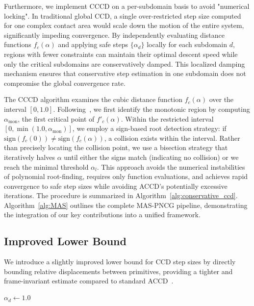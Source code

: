 \documentclass[acmtog,anonymous,review,screen,nonacm]{acmart}
\begin{document}
Furthermore, we implement CCCD on a per-subdomain basis to avoid "numerical locking". In traditional global CCD, a single over-restricted step size computed for one complex contact area would scale down the motion of the entire system, significantly impeding convergence. By independently evaluating distance functions $f_{c}(\alpha)$ and applying safe steps $\{\alpha_d\}$ locally for each subdomain $d$, regions with fewer constraints can maintain their optimal descent speed while only the critical subdomains are conservatively damped. This localized damping mechanism ensures that conservative step estimation in one subdomain does not compromise the global convergence rate.

The CCCD algorithm examines the cubic distance function $f_{c}(\alpha)$ over the interval $[0, 1.0]$. Following~\cite{cypo}, we first identify the monotonic region by computing $\alpha_{\text{mon}}$, the first critical point of $f'_{c}(\alpha)$. Within the restricted interval $[0, \min(1.0, \alpha_{\text{mon}})]$, we employ a sign-based root detection strategy: if $\text{sign}(f_{c}(0)) \neq \text{sign}(f_{c}(\alpha))$, a collision exists within the interval. Rather than precisely locating the collision point, we use a bisection strategy that iteratively halves $\alpha$ until either the signs match (indicating no collision) or we reach the minimal threshold $\alpha_l$. This approach avoids the numerical instabilities of polynomial root-finding, requires only function evaluations, and achieves rapid convergence to safe step sizes while avoiding ACCD’s potentially excessive iterations. The procedure is summarized in Algorithm~\ref{alg:conservative_ccd}.
Algorithm~\ref{alg:MAS} outlines the complete MAS-PNCG pipeline, demonstrating the integration of our key contributions into a unified framework.

\subsection{Improved Lower Bound}
\label{sec:tighter_lower_bound}
We introduce a slightly improved lower bound for CCD step sizes by directly bounding relative displacements between primitives, providing a tighter and frame-invariant estimate compared to standard ACCD~\cite{li2021codimensional}. 


\begin{algorithm}[htbp!]
\caption{Subdomain Conservative CCD}
\label{alg:conservative_ccd}
$\alpha_d \gets 1.0$\;
\end{algorithm}
\vspace{-10pt} 
\end{document}
